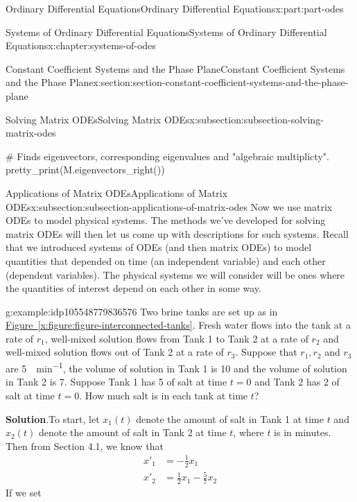 \documentclass[oneside,10pt,]{book}
\newcommand{\blocktitlefont}{\relax}
\newcommand{\xreffont}{\relax}
\numberwithin{equation}{part}
\newcommand{\amp}{&}
\begin{document}
\begin{partptx}{Ordinary Differential Equations}{}{Ordinary Differential Equations}{}{}{x:part:part-odes}
\begin{chapterptx}{Systems of Ordinary Differential Equations}{}{Systems of Ordinary Differential Equations}{}{}{x:chapter:systems-of-odes}
\begin{sectionptx}{Constant Coefficient Systems and the Phase Plane}{}{Constant Coefficient Systems and the Phase Plane}{}{}{x:section:section-constant-coefficient-systems-and-the-phase-plane}
\begin{subsectionptx}{Solving Matrix ODEs}{}{Solving Matrix ODEs}{}{}{x:subsection:subsection-solving-matrix-odes}
\begin{sageinput}
# Finds eigenvectors, corresponding eigenvalues and "algebraic multiplicty".
pretty_print(M.eigenvectors_right())
\end{sageinput}
\end{subsectionptx}
%
%
\typeout{************************************************}
\typeout{************************************************}
%
\begin{subsectionptx}{Applications of Matrix ODEs}{}{Applications of Matrix ODEs}{}{}{x:subsection:subsection-applications-of-matrix-odes}
Now we use matrix ODEs to model physical systems. The methods we've developed for solving matrix ODEs will then let us come up with descriptions for such systems. Recall that we introduced systems of ODEs (and then matrix ODEs) to model quantities that depended on time (an independent variable) and each other (dependent variables). The physical systems we will consider will be ones where the quantities of interest depend on each other in some way.%
\begin{example}{}{g:example:idp105548779836576}%
Two brine tanks are set up as in \hyperref[x:figure:figure-interconnected-tanks]{Figure~{\xreffont\ref{x:figure:figure-interconnected-tanks}}}. Fresh water flows into the tank at a rate of \(r_{1}\), well-mixed solution flows from Tank 1 to Tank 2 at a rate of \(r_{2}\) and well-mixed solution flows out of Tank 2 at a rate of \(r_{3}\). Suppose that \(r_{1}, r_{2}\) and  \(r_{3}\) are \SI{5}{\gallon\per\minute}, the volume of solution in Tank 1 is \SI{10}{\gallon} and the volume of solution in Tank 2 is \SI{7}{\gallon}. Suppose Tank 1 has \SI{5}{\pound} of salt at time \(t=0\) and Tank 2 has \SI{2}{\pound} of salt at time \(t=0\). How much salt is in each tank at time \(t\)?%
\par\smallskip%
\noindent\textbf{\blocktitlefont Solution}.\hypertarget{g:solution:idp105548779844512}{}\quad{}To start, let \(x_{1}(t)\) denote the amount of salt in Tank 1 at time \(t\) and \(x_{2}(t)\) denote the amount of salt in Tank 2 at time \(t\), where \(t\) is in minutes. Then from Section 4.1, we know that%
\begin{align*}
x'_{1} \amp = -\frac{1}{2}x_{1}\\
x'_{2} \amp = \frac{1}{2}x_{1}-\frac{5}{7}x_{2}
\end{align*}
If we set%
\begin{equation*}

\end{equation*}
\end{example}
\end{subsectionptx}
\end{sectionptx}
\end{chapterptx}
\end{partptx}
\end{document}
